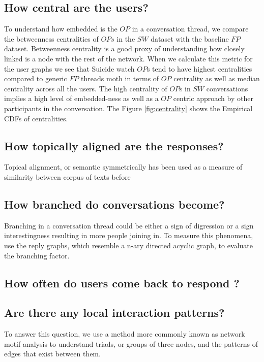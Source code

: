 \subsection{How central are the users?}
To understand how embedded is the $OP$ in a conversation thread, we compare the betweenness centralities of $OPs$ in the $SW$ dataset with the baseline $FP$ dataset. 
Betweenness centrality is a good proxy of understanding how closely linked is a node with the rest of the network. When we calculate this metric for the user graphs we see that Suicide watch $OP$s tend to have highest centralities compared to generic $FP$ threads moth in terms of $OP$ centrality as well as median centrality across all the users. The high centrality of $OP$s in $SW$ conversations implies a high level of embedded-ness as well as a $OP$ centric approach by other participants in the conversation. The Figure \ref{fig:centrality} shows the Empirical CDFs of centralities. 

\subsection{How topically aligned are the responses?}
Topical alignment, or semantic symmetrically has been used as a measure of similarity between corpus of texts before\cite{Blei2003}


\subsection{How branched do conversations become?}
Branching in a conversation thread could be either a sign of digression or a sign interestingness resulting in more people joining in. To measure this phenomena, use the reply graphs, which resemble a n-ary directed acyclic graph, to evaluate the branching factor. 

\subsection{How often do users come back to respond ? }



\subsection{Are there any local interaction patterns?}
To answer this question, we use a method more commonly known as network motif analysis to understand triads, or groups of three nodes, and the patterns of edges that exist between them. 


